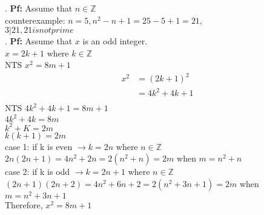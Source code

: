\documentclass[12pt]{article}
\begin{document}
.
\noindent \textbf{Pf:} Assume that $n\in \mathbb{Z}$\\
counterexample: $n=5, n^{2}-n+1=25-5+1=21,$\\
\vspace{.15in}
$3|21, 21 is not prime$\\

.
\noindent \textbf{Pf:} Assume that $x$ is an odd integer. \\
$x=2k+1$ where $k \in \mathbb{Z}$\\
NTS $x^{2}=8m+1$\\
\[
\begin{aligned}
x^{2}&=(2k+1)^{2}\\&=4k^{2}+4k+1\\
\end{aligned}
\]
NTS $4k^{2}+4k+1=8m+1$\\
$4k^{2}+4k=8m$\\
$k^{2}+K=2m$\\
$k(k+1)=2m$\\
case 1: if k is even $\to k=2n$ where $n\in \mathbb{Z}$\\
$2n(2n+1)=4n^{2}+2n=2(n^{2}+n)=2m$ when $m=n^{2}+n$\\
case 2: if k is odd $\to k=2n+1$ where $n\in \mathbb{Z}$\\
$(2n+1)(2n+2)=4n^{2}+6n+2=2(n^{2}+3n+1)=2m$ when $m=n^{2}+3n+1$\\
Therefore, $x^{2}=8m+1$
\end{document}
